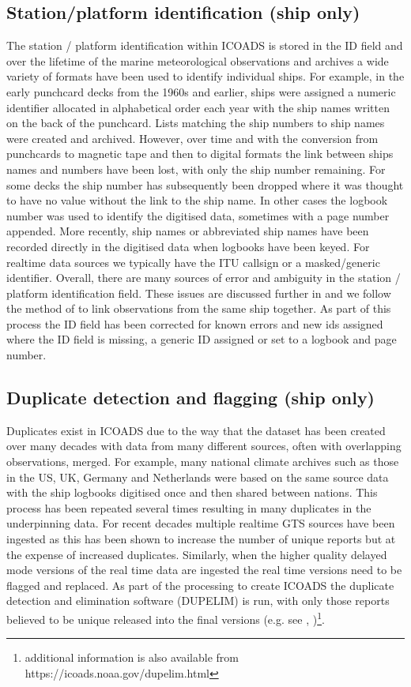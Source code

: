\subsection{Station/platform identification (ship only)}
The station / platform identification within ICOADS is stored in the ID field and over the lifetime of the marine meteorological observations and archives a wide variety of formats have been used to identify individual ships. 
For example, in the early punchcard decks from the 1960s and earlier, ships were assigned a numeric identifier allocated in alphabetical order each year with the ship names written on the back of the punchcard. Lists matching the ship numbers to ship names were created and archived. 
However, over time and with the conversion from punchcards to magnetic tape and then to digital formats the link between ships names and numbers have been lost, with only the ship number remaining.
For some decks the ship number has subsequently been dropped where it was thought to have no value without the link to the ship name.
In other cases the logbook number was used to identify the digitised data, sometimes with a page number appended.
More recently, ship names or abbreviated ship names have been recorded directly in the digitised data when logbooks have been keyed.
For realtime data sources we typically have the ITU callsign or a masked/generic identifier.
Overall, there are many sources of error and ambiguity in the station / platform identification field.
These issues are discussed further in \cite{Carella2017_tracking} and we follow the method of \cite{Carella2017_tracking} to link observations from the same ship together.
As part of this process the ID field has been corrected for known errors and new ids assigned where the ID field is missing, a generic ID assigned or set to a logbook and page number.

\subsection{Duplicate detection and flagging (ship only)} \label{ship-dupelim}
Duplicates exist in ICOADS due to the way that the dataset has been created over many decades with data from many different sources, often with overlapping observations, merged. 
For example, many national climate archives such as those in the US, UK, Germany and Netherlands were based on the same source data with the ship logbooks digitised once and then shared between nations. 
This process has been repeated several times resulting in many duplicates in the underpinning data. 
For recent decades multiple realtime GTS sources have been ingested as this has been shown to increase the number of unique reports but at the expense of increased duplicates. 
Similarly, when the higher quality delayed mode versions of the real time data are ingested the real time versions need to be flagged and replaced. 
As part of the processing to create ICOADS the duplicate detection and elimination software (DUPELIM) is run, with only those reports believed to be unique released into the final versions (e.g. see \cite{Freeman2017}, \cite{Woodruff2011})\footnote{additional information is also available from https://icoads.noaa.gov/dupelim.html}.

